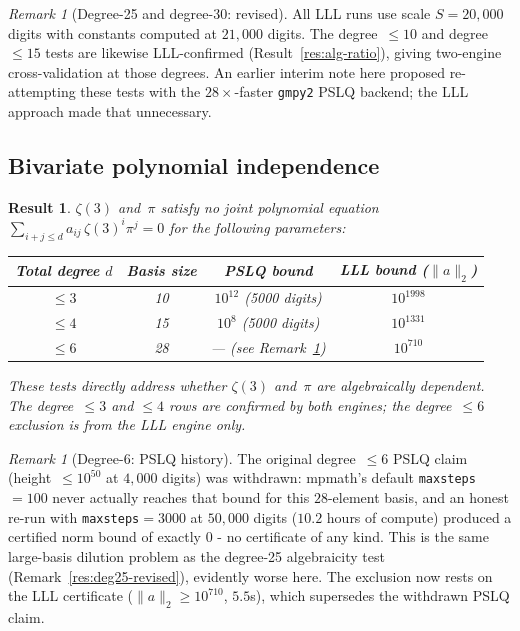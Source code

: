 \documentclass[12pt]{article}
\newtheorem{result}[theorem]{Result}
\theoremstyle{definition}
\theoremstyle{remark}
\newtheorem{remark}[theorem]{Remark}
\begin{document}
\begin{remark}[Degree-25 and degree-30: revised]
All LLL runs use scale $S = 20{,}000$ digits with constants computed
at $21{,}000$ digits.  The degree~$\le 10$ and degree~$\le 15$ tests
are likewise LLL-confirmed (Result~\ref{res:alg-ratio}), giving
two-engine cross-validation at those degrees.  An earlier interim note
here proposed re-attempting these tests with the $28\times$-faster
\texttt{gmpy2} PSLQ backend; the LLL approach made that unnecessary.
\end{remark}


\subsection{Bivariate polynomial independence}\label{sec:bivariate}

\begin{result}\label{res:bivariate}
$\zeta(3)$ and~$\pi$ satisfy no joint polynomial equation
$\sum_{i+j\le d}a_{ij}\,\zeta(3)^i\pi^j=0$ for the following
parameters:
\begin{center}
\begin{tabular}{@{}cccc@{}}
\toprule
Total degree $d$ & Basis size & PSLQ bound & LLL bound ($\|a\|_2$) \\
\midrule
$\le 3$ & 10 & $10^{12}$ (5000 digits) & $10^{1998}$ \\
$\le 4$ & 15 & $10^{8}$ (5000 digits) & $10^{1331}$ \\
$\le 6$ & 28 & --- (see Remark~\ref{res:biv6-withdrawn}) & $10^{710}$ \\
\bottomrule
\end{tabular}
\end{center}
These tests directly address whether $\zeta(3)$ and~$\pi$ are
algebraically dependent.  The degree~$\le 3$ and $\le 4$ rows are
confirmed by both engines; the degree~$\le 6$ exclusion is from the
LLL engine only.
\end{result}

\begin{remark}[Degree-6: PSLQ history]\label{res:biv6-withdrawn}
The original degree~$\le 6$ PSLQ claim (height~$\le 10^{50}$ at
$4{,}000$ digits) was withdrawn: mpmath's default
\texttt{maxsteps}$=100$ never actually reaches that bound for this
$28$-element basis, and an honest re-run with
\texttt{maxsteps}$=3000$ at $50{,}000$ digits ($10.2$ hours of
compute) produced a certified norm bound of exactly $0$ - no
certificate of any kind.  This is the same large-basis dilution
problem as the degree-25 algebraicity test
(Remark~\ref{res:deg25-revised}), evidently worse here.  The exclusion
now rests on the LLL certificate ($\|a\|_2 \ge 10^{710}$, $5.5$s),
which supersedes the withdrawn PSLQ claim.
\end{remark}
\end{document}
